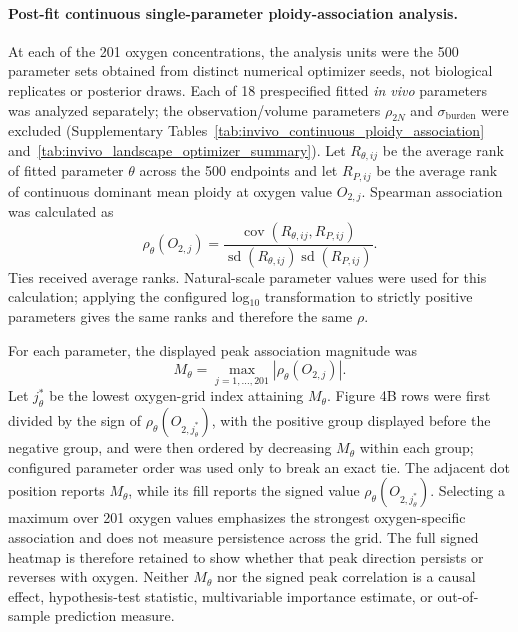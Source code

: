 \documentclass[11pt]{article}
\begin{document}
\paragraph{Post-fit continuous single-parameter ploidy-association analysis.}
At each of the 201 oxygen concentrations, the analysis units were the 500 parameter sets obtained from distinct numerical optimizer seeds, not biological replicates or posterior draws. Each of 18 prespecified fitted \textit{in vivo} parameters was analyzed separately; the observation/volume parameters $\rho_{2N}$ and $\sigma_{\mathrm{burden}}$ were excluded (Supplementary Tables~\ref{tab:invivo_continuous_ploidy_association} and~\ref{tab:invivo_landscape_optimizer_summary}). Let $R_{\theta,ij}$ be the average rank of fitted parameter $\theta$ across the 500 endpoints and let $R_{P,ij}$ be the average rank of continuous dominant mean ploidy at oxygen value $O_{2,j}$. Spearman association was calculated as
\begin{equation}
\rho_{\theta}(O_{2,j})
=
\frac{\operatorname{cov}\!\left(R_{\theta,ij},R_{P,ij}\right)}
{\operatorname{sd}\!\left(R_{\theta,ij}\right)
 \operatorname{sd}\!\left(R_{P,ij}\right)}.
\label{eq:appendix_continuous_ploidy_spearman}
\end{equation}
Ties received average ranks. Natural-scale parameter values were used for this calculation; applying the configured log$_{10}$ transformation to strictly positive parameters gives the same ranks and therefore the same $\rho$.

For each parameter, the displayed peak association magnitude was
\begin{equation}
M_{\theta}
=
\max_{j=1,\ldots,201}
\left|\rho_{\theta}(O_{2,j})\right|.
\label{eq:appendix_max_absolute_spearman}
\end{equation}
Let $j_\theta^*$ be the lowest oxygen-grid index attaining $M_\theta$. Figure 4B rows were first divided by the sign of $\rho_\theta(O_{2,j_\theta^*})$, with the positive group displayed before the negative group, and were then ordered by decreasing $M_\theta$ within each group; configured parameter order was used only to break an exact tie. The adjacent dot position reports $M_\theta$, while its fill reports the signed value $\rho_\theta(O_{2,j_\theta^*})$. Selecting a maximum over 201 oxygen values emphasizes the strongest oxygen-specific association and does not measure persistence across the grid. The full signed heatmap is therefore retained to show whether that peak direction persists or reverses with oxygen. Neither $M_\theta$ nor the signed peak correlation is a causal effect, hypothesis-test statistic, multivariable importance estimate, or out-of-sample prediction measure.
\end{document}
